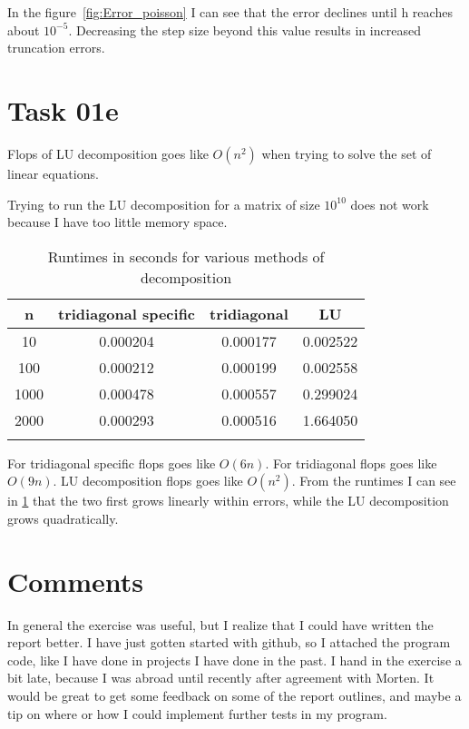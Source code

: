 In the figure~\ref{fig:Error_poisson} I can see that the error declines until h reaches about $10^{-5}$. Decreasing the step size beyond this value results in increased truncation errors.\\


\section{Task 01e}
Flops of LU decomposition goes like $O(n^2)$ when trying to solve the set of linear equations.

Trying to run the LU decomposition for a matrix of size $10^{10}$ does not work because I have too little memory space.

\FloatBarrier
\begin{table}[!ht]
\centering
\begin{tabular}{|c|c|c|c|}
\hline 
n & tridiagonal specific & tridiagonal & LU \\ 
\hline 
10 & 0.000204 & 0.000177 & 0.002522 \\ 
\hline 
100 & 0.000212 & 0.000199 & 0.002558 \\ 
\hline 
1000 & 0.000478 & 0.000557 & 0.299024 \\ 
\hline 
2000 & 0.000293 & 0.000516 & 1.664050 \\
\hline 

\label{Runtimes for various methods of decomposition}
\end{tabular} 
\caption{Runtimes in seconds for various methods of decomposition}
\end{table}
\FloatBarrier

For tridiagonal specific flops goes like $O(6n)$. For tridiagonal flops goes like $O(9n)$. LU decomposition flops goes like $O(n^2)$. From the runtimes I can see in \ref{Runtimes for various methods of decomposition} that the two first grows linearly within errors, while the LU decomposition grows quadratically.\\


\section{Comments}
In general the exercise was useful, but I realize that I could have written the report better. I have just gotten started with github, so I attached the program code, like I have done in projects I have done in the past. I hand in the exercise a bit late, because I was abroad until recently after agreement with Morten. It would be great to get some feedback on some of the report outlines, and maybe a tip on where or how I could implement further tests in my program. 